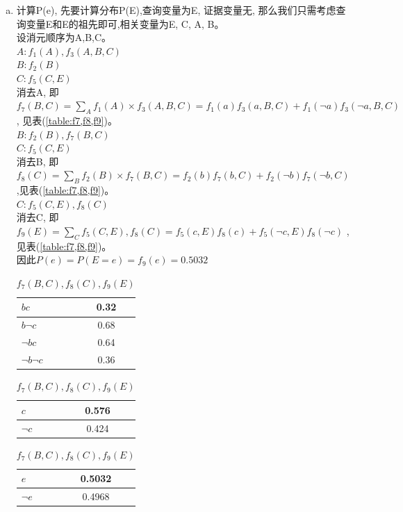 \documentclass[a4paper, 11pt]{article}
\begin{document}
\begin{enumerate}
    \begin{enumerate}[(a)]
      \item 计算P(e), 先要计算分布P(E),查询变量为E, 证据变量无,
      那么我们只需考虑查询变量E和E的祖先即可,相关变量为E, C, A, B。\\
      设消元顺序为A,B,C。\\
      $A: f_{1}(A), f_{3}(A,B,C)$\\
      $B: f_{2}(B)$\\
      $C: f_{5}(C,E)$\\
      消去A, 即$f_{7}(B,C) = \sum_{A}f_{1}(A) \times f_{3}(A,B,C) = f_{1}(a)f_{3}(a,B,C) + f_{1}(\lnot a)f_{3}(\lnot a,B,C)$,
      见表(\ref{table:f7,f8,f9})。\\
      $B: f_{2}(B), f_{7}(B,C)$\\
      $C: f_{5}(C,E)$\\
      消去B, 即$f_{8}(C) = \sum_{B}f_{2}(B) \times f_{7}(B,C) = f_{2}(b)f_{7}(b,C) + f_{2}(\lnot b)f_{7}(\lnot b,C)$
      ,见表(\ref{table:f7,f8,f9})。\\
      $C:f_{5}(C,E), f_{8}(C)$\\
      消去C, 即$f_{9}(E) = \sum_{C}f_{5}(C,E), f_{8}(C) = f_{5}(c,E)f_{8}(c) + f_{5}(\lnot c,E)f_{8}(\lnot c)$
      ,见表(\ref{table:f7,f8,f9})。\\
      因此$P(e)=P(E=e)=f_{9}(e)=0.5032$
      \begin{table}[!htbp]
        \centering
        \begin{tabular}{|l|c|}
          \hline
          $bc$&0.32\\
          \hline
          $b\lnot c$&0.68\\
          \hline
          $\lnot bc$&0.64\\
          \hline
          $\lnot b\lnot c$&0.36\\
          \hline
        \end{tabular}
        \begin{tabular}{|l|c|}
          \hline
          $c$&0.576\\
          \hline
          $\lnot c$&0.424\\
          \hline
        \end{tabular}
        \begin{tabular}{|l|c|}
          \hline
          $e$&0.5032\\
          \hline
          $\lnot e$&0.4968\\
          \hline
        \end{tabular}
        \caption{$f_{7}(B,C),f_{8}(C),f_{9}(E)$}

\end{table}
\end{enumerate}
\end{enumerate}
\end{document}
